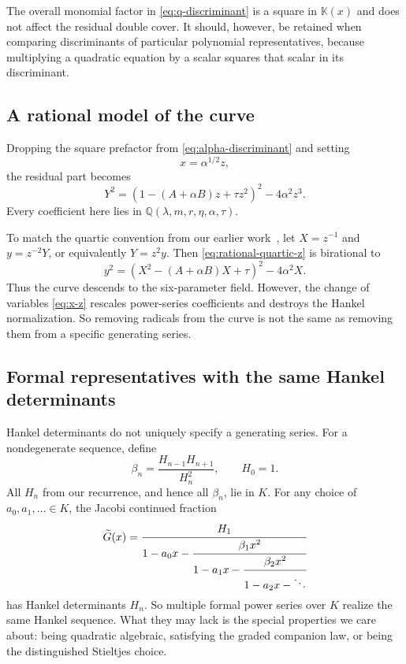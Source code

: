 \documentclass[11pt]{article}
\theoremstyle{definition}
\theoremstyle{remark}
\newcommand{\K}{\mathbb{K}}
\newcommand{\Q}{\mathbb{Q}}
\begin{document}
The overall monomial factor in \eqref{eq:q-discriminant} is a square in
$\K(x)$ and does not affect the residual double cover.  It should, however,
be retained when comparing discriminants of particular polynomial
representatives, because multiplying a quadratic equation by a scalar squares
that scalar in its discriminant.

\subsection{A rational model of the curve}
Dropping the square prefactor from \eqref{eq:alpha-discriminant} and setting
\begin{equation}
 x=\alpha^{1/2}z,
 \label{eq:x-z}
\end{equation}
the residual part becomes
\begin{equation}
 Y^2=\left(1-(A+\alpha B)z+\tau z^2\right)^2
      -4\alpha^2z^3.
 \label{eq:rational-quartic-z}
\end{equation}
Every coefficient here lies in $\Q(\lambda,m,r,\eta,\alpha,\tau)$.

To match the quartic convention from our earlier work~\cite{Scheuerle2026},
let $X=z^{-1}$ and $y=z^{-2}Y$, or equivalently $Y=z^2y$. Then
\eqref{eq:rational-quartic-z} is birational to
\begin{equation}
 y^2=\left(X^2-(A+\alpha B)X+\tau\right)^2-4\alpha^2X.
 \label{eq:rational-quartic-X}
\end{equation}
Thus the curve descends to the six-parameter field. However, the change of
variables \eqref{eq:x-z} rescales power-series coefficients and destroys the
Hankel normalization. So removing radicals from the curve is not the same as
removing them from a specific generating series.

\subsection{Formal representatives with the same Hankel determinants}
Hankel determinants do not uniquely specify a generating series. For a
nondegenerate sequence, define
\begin{equation}
 \beta_n=\frac{H_{n-1}H_{n+1}}{H_n^2},\qquad H_0=1.
 \label{eq:jacobi-beta}
\end{equation}
All $H_n$ from our recurrence, and hence all $\beta_n$, lie in $K$. For any
choice of $a_0,a_1,\ldots\in K$, the Jacobi continued fraction
\begin{equation}
 \widetilde G(x)=
 \cfrac{H_1}{1-a_0x-
  \cfrac{\beta_1x^2}{1-a_1x-
   \cfrac{\beta_2x^2}{1-a_2x-\ddots}}}
 \label{eq:jacobi-representative}
\end{equation}
has Hankel determinants $H_n$. So multiple formal power series over $K$
realize the same Hankel sequence. What they may lack is the special properties
we care about: being quadratic algebraic, satisfying the graded companion law,
or being the distinguished Stieltjes choice.
\end{document}
